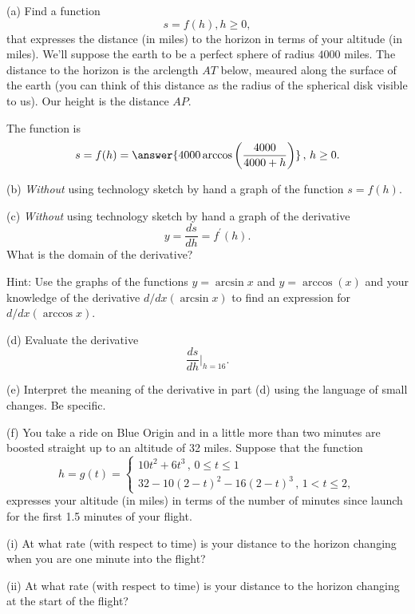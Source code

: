 \documentclass{ximera}
\begin{document}
\begin{question}  \label{Q:LLKDKFG}
(a) Find a function
\[
     s = f(h) , h\geq 0 ,
\]
that expresses the distance (in miles) to the horizon in terms of your altitude (in miles). We'll suppose the earth to be a perfect sphere of radius $4000$ miles. The distance to the horizon is the arclength $AT$ below, meaured along the surface of the earth (you can think of this distance as the radius of the spherical disk visible to us). Our height is the distance $AP$. 
 
The function is 
\[
   s = f(h) = \answer{4000 \arccos\left( \frac{4000}{4000+h} \right) } \, , \, h \geq 0 .
\]

\begin{onlineOnly}
    \begin{center}
\end{center}
\end{onlineOnly}

(b) \emph{Without} using technology sketch by hand a graph of the function $s=f(h)$.

(c) \emph{Without} using technology sketch by hand a graph of the derivative
\[
   y = \frac{ds}{dh} = f^\prime(h) .
\] 
What is the domain of the derivative?

Hint: Use the graphs of the functions $y=\arcsin x$ and $y=\arccos(x)$ and your knowledge of the derivative $d/dx(\arcsin x)$ to find an expression for $d/dx (\arccos x)$.


(d) Evaluate the derivative 
\[
      \frac{ds}{dh}\Big|_{h=16} .
\]

(e) Interpret the meaning of the derivative in part (d) using the language of small changes. Be specific.

(f) You take a ride on Blue Origin and in a little more than two minutes are boosted straight up to an altitude of 32 miles. Suppose that the function
\[
      h = g(t) = 
\begin{cases}
10t^2 + 6t^3 \, , \, 0\leq t \leq 1  \\
32 - 10(2-t)^2 - 16(2-t)^3 \, , \, 1<t \leq 2 ,
\end{cases}
\]
expresses your altitude (in miles) in terms of the number of minutes since launch for the first 1.5 minutes of your flight.

(i) At what rate (with respect to time) is your distance to the horizon changing when you are one minute into the flight?

(ii)  At what rate (with respect to time) is your distance to the horizon changing at the start of the flight?
\end{question}
\end{document}
